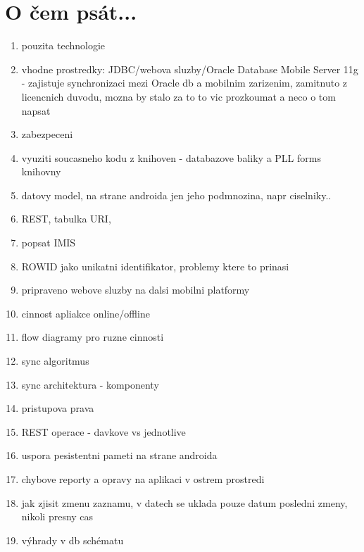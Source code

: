 \documentclass{bakalarka}
\begin{document}
\section{O čem psát...}
\begin{enumerate}
\item pouzita technologie
\item vhodne prostredky: JDBC/webova sluzby/Oracle Database Mobile Server 11g - zajistuje synchronizaci mezi Oracle db a mobilnim zarizenim, zamitnuto z licencnich duvodu, mozna by stalo za to to vic prozkoumat a neco o tom napsat
\item zabezpeceni
\item vyuziti soucasneho kodu z knihoven - databazove baliky a PLL forms knihovny
\item datovy model, na strane androida jen jeho podmnozina, napr ciselniky..
\item REST, tabulka URI, 
\item popsat IMIS 
\item ROWID jako unikatni identifikator, problemy ktere to prinasi
\item pripraveno webove sluzby na dalsi mobilni platformy
\item cinnost apliakce online/offline
\item flow diagramy pro ruzne cinnosti
\item sync algoritmus
\item sync architektura - komponenty
\item pristupova prava
\item REST operace - davkove vs jednotlive
\item uspora pesistentni pameti na strane androida
\item chybove reporty a opravy na aplikaci v ostrem prostredi
\item jak zjisit zmenu zaznamu, v datech se uklada pouze datum posledni zmeny, nikoli presny cas
\item výhrady v db schématu
\end{enumerate}
\end{document}
